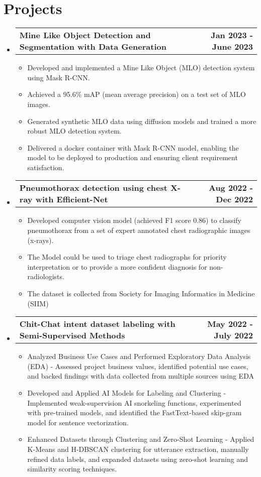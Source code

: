 \documentclass[letterpaper,11pt]{article}
\makeatletter
\newcommand{\resumeItem}[1]{
  \item\small{
    {#1 \vspace{-2pt}}
  }
}
\newcommand{\resumeProjectHeading}[2]{
    \item
    \begin{tabular*}{1.001\textwidth}{l@{\extracolsep{\fill}}r}
      \small#1 & \textbf{\small #2}\\
    \end{tabular*}\vspace{-7pt}
}
\newcommand{\resumeSubHeadingListStart}{\begin{itemize}[leftmargin=0.0in, label={}]}
\newcommand{\resumeSubHeadingListEnd}{\end{itemize}}
\newcommand{\resumeItemListStart}{\begin{itemize}}
\newcommand{\resumeItemListEnd}{\end{itemize}\vspace{-5pt}}
\makeatother
\begin{document}
\section{Projects}
    \resumeSubHeadingListStart
      \resumeProjectHeading
          {\textbf{Mine Like Object Detection and Segmentation with Data Generation}}{Jan 2023 - June 2023}
          \resumeItemListStart
            \resumeItem{Developed and implemented a Mine Like Object (MLO) detection system using Mask R-CNN.}
            \resumeItem{Achieved a 95.6\% mAP (mean average precision) on a test set of MLO images.}
            \resumeItem{Generated synthetic MLO data using diffusion models and trained a more robust MLO detection system.}
            \resumeItem{Delivered a docker container with Mask R-CNN model, enabling the model to be deployed to production and ensuring client requirement satisfaction.}
            \resumeItemListEnd
    \resumeProjectHeading
          {\textbf{Pneumothorax detection using chest X-ray with Efficient-Net}}{Aug 2022 - Dec 2022}
          \resumeItemListStart
            \resumeItem{Developed computer vision model (achieved F1 score 0.86) to classify pneumothorax from a set of expert annotated chest radiographic images (x-rays).}
            \resumeItem{The Model could be used to triage chest radiographs for priority interpretation or to provide a more confident diagnosis for non-radiologists.}
            \resumeItem{The dataset is collected from Society for Imaging Informatics in Medicine (SIIM)}
            \resumeItemListEnd     
      \resumeProjectHeading
          {\textbf{Chit-Chat intent dataset labeling with Semi-Supervised Methods}}{May 2022 - July 2022}
        \resumeItemListStart
            \resumeItem{Analyzed Business Use Cases and Performed Exploratory Data Analysis (EDA) - Assessed project business values, identified potential use cases, and backed findings with data collected from multiple sources using EDA}
            \resumeItem{Developed and Applied AI Models for Labeling and Clustering - Implemented weak-supervision AI snorkeling functions, experimented with pre-trained models, and identified the FastText-based skip-gram model for sentence vectorization.}
            \resumeItem{Enhanced Datasets through Clustering and Zero-Shot Learning - Applied K-Means and H-DBSCAN clustering for utterance extraction, manually refined data labels, and expanded datasets using zero-shot learning and similarity scoring techniques.}
        \resumeItemListEnd
\resumeSubHeadingListEnd
        
\end{document}
